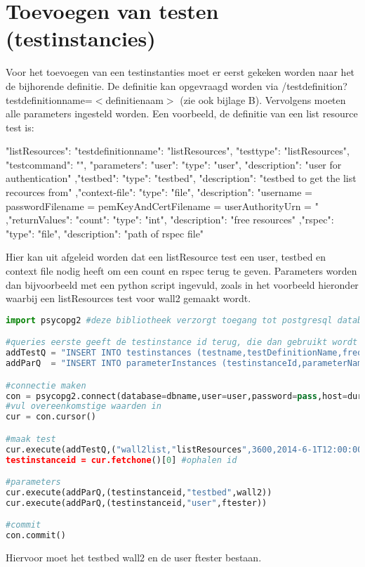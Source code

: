\section{Toevoegen van testen (testinstancies)}
\npar
Voor het toevoegen van een testinstanties moet er eerst gekeken worden naar het de bijhorende definitie. De definitie kan opgevraagd worden via /testdefinition?testdefinitionname=$<$definitienaam$>$ (zie ook bijlage B). Vervolgens moeten alle parameters ingesteld worden. 
\npar 
Een voorbeeld, de definitie van een list resource test is:
\begin{lt}
    "listResources": {
        "testdefinitionname": "listResources",
        "testtype": "listResources",
        "testcommand": "",
        "parameters": {
            "user": {
                "type": "user",
                "description": "user for authentication"
            },"testbed": {
                "type": "testbed",
                "description": "testbed to get the list recources from"
            },"context-file": {
                "type": "file",
                "description": "username = \n    passwordFilename = \n    pemKeyAndCertFilename = \n    userAuthorityUrn = "
            }
        },"returnValues": {
            "count": {
                "type": "int",
                "description": "free resources"
            },"rspec": {
                "type": "file",
                "description": "path of rspec file"
            }
        }
    }
\end{lt}
\npar 
Hier kan uit afgeleid worden dat een listResource test een user, testbed en context file nodig heeft om een count en rspec terug te geven. Parameters worden dan bijvoorbeeld met een python script ingevuld, zoals in het voorbeeld hieronder waarbij een listResources test voor wall2 gemaakt wordt.
\clearpage
\begin{lstlisting}[language=Python]
import psycopg2 #deze bibliotheek verzorgt toegang tot postgresql databanken vanuit python

#queries eerste geeft de testinstance id terug, die dan gebruikt wordt om de parameters toe te voegen.
addTestQ = "INSERT INTO testinstances (testname,testDefinitionName,frequency,nextrun,enabled) VALUES(\%s,\%s,\%s,\%s,\%s) RETURNING testinstanceid"
addParQ  = "INSERT INTO parameterInstances (testinstanceId,parameterName,parametervalue) VALUES (\%s,\%s,\%s)"

#connectie maken
con = psycopg2.connect(database=dbname,user=user,password=pass,host=durl) 
#vul overeenkomstige waarden in
cur = con.cursor()

#maak test
cur.execute(addTestQ,("wall2list,"listResources",3600,2014-6-1T12:00:00,true))
testinstanceid = cur.fetchone()[0] #ophalen id

#parameters
cur.execute(addParQ,(testinstanceid,"testbed",wall2))	
cur.execute(addParQ,(testinstanceid,"user",ftester))

#commit
con.commit()

\end{lstlisting}
\npar
Hiervoor moet het testbed wall2 en de user ftester bestaan.

